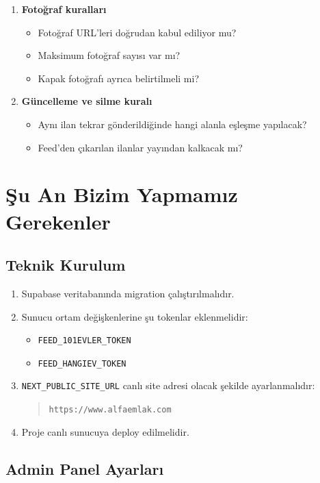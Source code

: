 \documentclass[11pt,a4paper]{article}
\newcommand{\code}[1]{\texttt{#1}}
\begin{document}
\begin{enumerate}
  \item \textbf{Fotoğraf kuralları}
  \begin{itemize}
    \item Fotoğraf URL'leri doğrudan kabul ediliyor mu?
    \item Maksimum fotoğraf sayısı var mı?
    \item Kapak fotoğrafı ayrıca belirtilmeli mi?
  \end{itemize}

  \item \textbf{Güncelleme ve silme kuralı}
  \begin{itemize}
    \item Aynı ilan tekrar gönderildiğinde hangi alanla eşleşme yapılacak?
    \item Feed'den çıkarılan ilanlar yayından kalkacak mı?
  \end{itemize}
\end{enumerate}

\section{Şu An Bizim Yapmamız Gerekenler}

\subsection{Teknik Kurulum}

\begin{enumerate}
  \item Supabase veritabanında migration çalıştırılmalıdır.
  \item Sunucu ortam değişkenlerine şu tokenlar eklenmelidir:
  \begin{itemize}
    \item \code{FEED\_101EVLER\_TOKEN}
    \item \code{FEED\_HANGIEV\_TOKEN}
  \end{itemize}
  \item \code{NEXT\_PUBLIC\_SITE\_URL} canlı site adresi olacak şekilde ayarlanmalıdır:
  \begin{quote}
    \code{https://www.alfaemlak.com}
  \end{quote}
  \item Proje canlı sunucuya deploy edilmelidir.
\end{enumerate}

\subsection{Admin Panel Ayarları}
\end{document}

